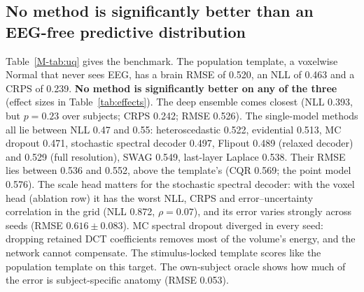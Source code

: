 \subsection{No method is significantly better than an EEG-free predictive distribution}\label{sec:res:uq}


Table~\ref{M-tab:uq} gives the benchmark. The population template, a voxelwise Normal that never sees EEG, has a brain RMSE of 0.520, an NLL of 0.463 and a CRPS of 0.239. \textbf{No method is significantly better on any of the three} (effect sizes in Table~\ref{tab:effects}). The deep ensemble comes closest (NLL 0.393, but $p=0.23$ over subjects; CRPS 0.242; RMSE 0.526). The single-model methods all lie between NLL 0.47 and 0.55: heteroscedastic 0.522, evidential 0.513, MC dropout 0.471, stochastic spectral decoder 0.497, Flipout 0.489 (relaxed decoder) and 0.529 (full resolution), SWAG 0.549, last-layer Laplace 0.538. Their RMSE lies between 0.536 and 0.552, above the template's (CQR 0.569; the point model 0.576). The scale head matters for the stochastic spectral decoder: with the voxel head (ablation row) it has the worst NLL, CRPS and error--uncertainty correlation in the grid (NLL 0.872, $\rho=0.07$), and its error varies strongly across seeds (RMSE $0.616\pm0.083$). MC spectral dropout diverged in every seed: dropping retained DCT coefficients removes most of the volume's energy, and the network cannot compensate. The stimulus-locked template scores like the population template on this target. The own-subject oracle shows how much of the error is subject-specific anatomy (RMSE 0.053).

\begin{table}[!htbp]
	\centering
	\caption{Effect sizes for the claims of absence (run-z-score target, 17 subjects). Hodges--Lehmann estimate of the paired difference over subjects with a subject-bootstrap 95\% CI, and the $p$-value of a non-superiority test against the smallest effect size of interest $\delta$ (bold: $p<0.05$, i.e.\ an improvement of at least $\delta$ is rejected). $\Delta$NLL and $\Delta$CRPS: method minus population template ($\delta_{\mathrm{NLL}}=\sesoiNLL$, $\delta_{\mathrm{CRPS}}=\sesoiCRPS$, 5\% of the template--oracle gap; negative is better). $\Delta r$: median voxel temporal $r$ with the real EEG minus with another subject's EEG ($\delta_r=0.05$).}
	\label{tab:effects}
	\setlength{\tabcolsep}{3pt}
\end{table}

